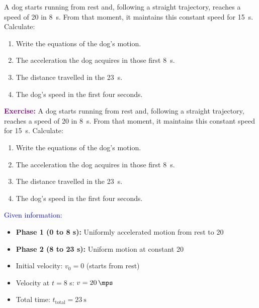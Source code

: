 \begin{exercise}
    A dog starts running from rest and, following a straight trajectory, reaches a speed of \qty{20}{\mps} in \qty{8}{\s}.
    From that moment, it maintains this constant speed for \qty{15}{\s}.
    Calculate:
    \begin{enumerate}[label=\letraminuscula]
    \item Write the equations of the dog’s motion.
    \item The acceleration the dog acquires in those first \qty{8}{\s}.
    \item The distance travelled in the \qty{23}{\s}.
    \item The dog’s speed in the first four seconds.
    \end{enumerate}
    \begin{solu}
        \textbf{\textcolor{purple}{Exercise:}} A dog starts running from rest and, following a straight trajectory, reaches a speed of \qty{20}{\mps} in \qty{8}{\s}.
        From that moment, it maintains this constant speed for \qty{15}{\s}.
        Calculate:
        \begin{enumerate}[label=\letraminuscula]
    \item Write the equations of the dog's motion.
    \item The acceleration the dog acquires in those first \qty{8}{\s}.
    \item The distance travelled in the \qty{23}{\s}.
    \item The dog's speed in the first four seconds.
        \end{enumerate}

        \vspace{0.3cm}

        \textcolor{blue}{Given information:}
        \begin{itemize}
            \item \textbf{Phase 1 (0 to 8 s):} Uniformly accelerated motion from rest to \qty{20}{\mps}
            \item \textbf{Phase 2 (8 to 23 s):} Uniform motion at constant \qty{20}{\mps}
            \item Initial velocity: $v_0 = 0$ (starts from rest)
            \item Velocity at $t = 8$ s: $v = \qty{20}{\mps}$
            \item Total time: $t_{\text{total}} = \qty{23}{\s}$
        \end{itemize}


\end{solu}
\end{exercise}
